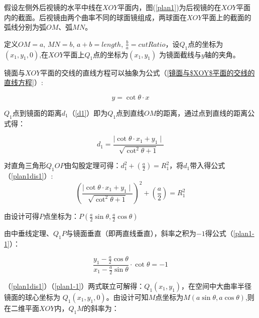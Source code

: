 \documentclass[bwprint]{cumcmthesis}
\begin{document}
\par 假设左侧外后视镜的水平中线在$XOY$平面内，图(\ref{plan1})为后视镜的在$XOY$平面内的截面。后视镜由两个曲率不同的球面镜组成，两球面在$XOY$平面上的截面的弧线分别为弧$OM$、弧$MN$。

\par 定义$OM = a$, $MN = b$, $a + b = length$, $\frac{b}{a} = cutRatio$，设$Q_1$点的坐标为$(x_1,y_1,0)$,在$XOY$平面上$Q_1$点的坐标为$(x_1,y_1)$ 为镜面截线与$y$轴的夹角。

\par 镜面与$XOY$平面的交线的直线方程可以抽象为公式（\ref{镜面与$XOY$平面的交线的直线方程}）:
 
\begin{equation}
\label{镜面与$XOY$平面的交线的直线方程}
	y = \mathop{cot}\theta \cdot x
\end{equation}

$Q_1$点到镜面的距离$d_1$（\ref{d1}）即为$Q_1$点到直线$OM$的距离，通过点到直线的距离公式得：

\begin{equation}
\label{d1}
	d_1 = \frac{\mid \mathop{cot}\theta \cdot x_1 + y_1 \mid}{\sqrt{\mathop{cot}^{2} \theta + 1}} 
\end{equation}

\par 对直角三角形$Q_1OP$由勾股定理可得：$ d_1^2 + \left( \frac{a}{2} \right) = R_1^2$，将$d_1$带入得公式（\ref{plan1dis1}）:
\begin{equation}
\label{plan1dis1}
	\left( \frac{\mid \mathop{cot}\theta \cdot x_1 + y_1 \mid}{\sqrt{\mathop{cot}^{2} \theta + 1}} \right)^2 +\left( \frac{a}{2} \right) = R_1^2
\end{equation}

\par 由设计可得$P$点坐标为：$P(\frac{a}{2} \mathop{sin} \theta, \frac{a}{2} \mathop{cos} \theta)$

\par 由中垂线定理、$Q_1P$与镜面垂直（即两直线垂直），斜率之积为$-1$得公式（\ref{plan1-1}）：

\begin{equation}
\label{plan1-1}
	\frac{y_1 - \frac{a}{2} \mathop{cos} \theta}{x_1 - \frac{a}{2} \mathop{sin} \theta} \cdot \mathop{cot}\theta = -1
\end{equation}

\par （\ref{plan1dis1}）（\ref{plan1-1}）两式联立可解得：$Q_1(x_1,y_1)$，在空间中大曲率半径镜面的球心坐标为 $Q_1(x_1,y_1,0)$。由设计可知$M$点坐标为$M(a \mathop{sin} \theta, a \mathop{cos} \theta)$,则在二维平面$XOY$内，$Q_1M$的斜率为：
\end{document}
